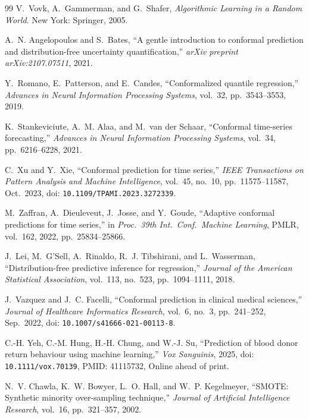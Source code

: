 \documentclass[12pt,a4paper]{article}
\begin{document}
\begin{thebibliography}{99}
V.~Vovk, A.~Gammerman, and G.~Shafer,
\textit{Algorithmic Learning in a Random World}.
New York: Springer, 2005.

A.~N. Angelopoulos and S.~Bates,
``A gentle introduction to conformal prediction and distribution-free
uncertainty quantification,''
\textit{arXiv preprint arXiv:2107.07511}, 2021.

Y.~Romano, E.~Patterson, and E.~Candes,
``Conformalized quantile regression,''
\textit{Advances in Neural Information Processing Systems},
vol.~32, pp.~3543--3553, 2019.

K.~Stankeviciute, A.~M. Alaa, and M.~van der Schaar,
``Conformal time-series forecasting,''
\textit{Advances in Neural Information Processing Systems},
vol.~34, pp.~6216--6228, 2021.

C.~Xu and Y.~Xie,
``Conformal prediction for time series,''
\textit{IEEE Transactions on Pattern Analysis and Machine Intelligence},
vol.~45, no.~10, pp.~11575--11587, Oct.\ 2023,
doi: \texttt{10.1109/TPAMI.2023.3272339}.

M.~Zaffran, A.~Dieuleveut, J.~Josse, and Y.~Goude,
``Adaptive conformal predictions for time series,''
in \textit{Proc.\ 39th Int.\ Conf.\ Machine Learning},
PMLR, vol.~162, 2022, pp.~25834--25866.

J.~Lei, M.~G'Sell, A.~Rinaldo, R.~J. Tibshirani, and L.~Wasserman,
``Distribution-free predictive inference for regression,''
\textit{Journal of the American Statistical Association},
vol.~113, no.~523, pp.~1094--1111, 2018.

J.~Vazquez and J.~C. Facelli,
``Conformal prediction in clinical medical sciences,''
\textit{Journal of Healthcare Informatics Research},
vol.~6, no.~3, pp.~241--252, Sep.\ 2022,
doi: \texttt{10.1007/s41666-021-00113-8}.

C.-H. Yeh, C.-M. Hung, H.-H. Chung, and W.-J. Su,
``Prediction of blood donor return behaviour using machine learning,''
\textit{Vox Sanguinis}, 2025,
doi: \texttt{10.1111/vox.70139},
PMID: 41115732, Online ahead of print.

N.~V. Chawla, K.~W. Bowyer, L.~O. Hall, and W.~P. Kegelmeyer,
``SMOTE: Synthetic minority over-sampling technique,''
\textit{Journal of Artificial Intelligence Research},
vol.~16, pp.~321--357, 2002.

\end{thebibliography}
\end{document}
